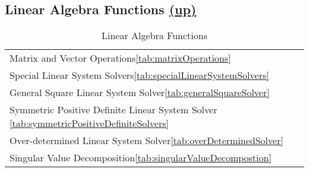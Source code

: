 \subsection*{
    Linear Algebra Functions 
    \hspace*{\fill} \hyperlink{VSIPspecHead}{(up)}}
\begin{table}[H]
\hypertarget{linearAlgebraFunctions}{}
\caption{Linear Algebra Functions}
\label{tab:linearAlgebraFunctions}
\begin{center}
\begin{tabular}{|l|}\hline
Matrix and Vector Operations\hspace*{\fill}\ref{tab:matrixOperations}\\
Special Linear System Solvers\hspace*{\fill}\ref{tab:specialLinearSystemSolvers}\\
General Square Linear System Solver\hspace*{\fill}\ref{tab:generalSquareSolver}\\
Symmetric Positive Definite Linear System Solver \hspace*{\fill}\ref{tab:symmetricPositiveDefiniteSolvers}\\
Over-determined Linear System Solver\hspace*{\fill}\ref{tab:overDeterminedSolver}\\
Singular Value Decomposition\hspace*{\fill}\ref{tab:singularValueDecompostion}\\
\hline\end{tabular}
\end{center}
\label{default}
\end{table}%
      
      
